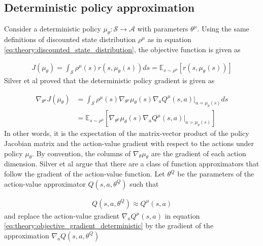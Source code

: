\documentclass[class=book, crop=false]{standalone}
\begin{document}
\subsection{Deterministic policy approximation}
Consider a deterministic policy $\mu_{\theta}: \mathcal{S} \to \mathcal{A}$ with parameters $\theta^{\mu}$. Using the same definitions of discounted state distribution $\rho^{\mu}$ as in equation
\eqref{eq:theory:discounted_state_distribution}, the objective function is given as 

\begin{equation}
   \begin{aligned}\label{eq:theory:objective_expected_deterministic}
    J(\mu_{\theta}) =
    \int_{\mathcal{S}}
    \rho^{\mu}(s)r(s,\mu_{\theta}(s)) ds = \mathbb{E}_{s\sim \rho^{\mu}}[r(s,\mu_{\theta}(s))]
\end{aligned} 
\end{equation}
Silver et al \cite{pmlr-v32-silver14} proved that the deterministic policy gradient is given as 

\begin{equation}
   \begin{aligned}\label{eq:theory:objective_gradient_deterministic}
    \nabla_{\theta^{\mu}}J(\mu_{\theta}) &=
    \int_{\mathcal{S}}
    \rho^{\mu}(s)
    \nabla_{\theta^{\mu}} \mu_{\theta}(s)
    \nabla_{a} Q^{\mu}(s,a)|_{a = \mu_{\theta}(s)}ds 
    \\
    &= \mathbb{E}_{s\sim \rho^{\mu}}
    [    \nabla_{\theta^{\mu}} \mu_{\theta}(s)
    \nabla_{a} Q^{\mu}(s,a)|_{a = \mu_{\theta}(s)}]
\end{aligned} 
\end{equation}
In other words, it is the expectation of the matrix-vector product of the policy Jacobian matrix and the action-value gradient with respect to the actions under policy $\mu_{\theta}$. By convention, the columns of $\nabla_{\theta} \mu_{\theta}$ are the gradient of each action dimension. Silver et al argue that there are a class of function approximators that follow the gradient of the action-value function. Let $\theta^{Q}$ be the parameters of the action-value approximator $Q(s,a,\theta^{Q})$ such that   

\begin{equation}
   \begin{aligned}\label{eq:theory:action-value_approx}
    Q(s,a,\theta^{Q}) \approx Q^{\mu}(s,a)
\end{aligned} 
\end{equation}
and replace the action-value gradient $\nabla_{a} Q^{\mu}(s,a)$ in equation \eqref{eq:theory:objective_gradient_deterministic} by
the gradient of the approximation $\nabla_{a} Q(s,a,\theta^{Q})$
\end{document}
